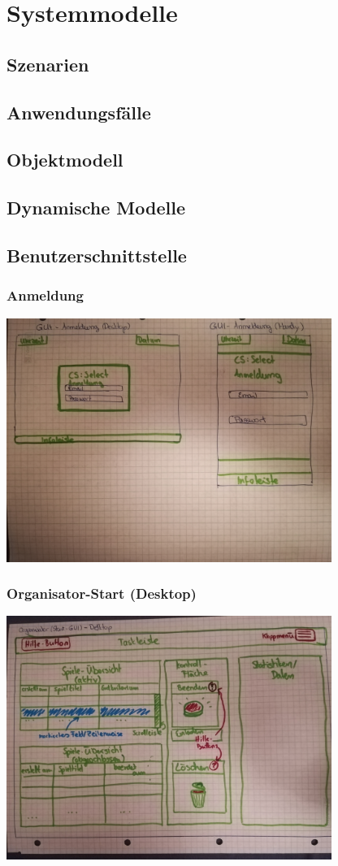 \documentclass[a4paper]{scrreprt}
\begin{document}
\chapter{Systemmodelle}
\section{Szenarien}
\section{Anwendungsfälle}
\section{Objektmodell}
\section{Dynamische Modelle}
\section{Benutzerschnittstelle}
    \subsection{Anmeldung}
        \centering
        \includegraphics[width=400px]{../pictures/1_Anmeldung.jpg}
    \subsection{Organisator-Start (Desktop)}
        \centering
        \includegraphics[width=400px]{../pictures/2_Organisator.jpg}
\end{document}

